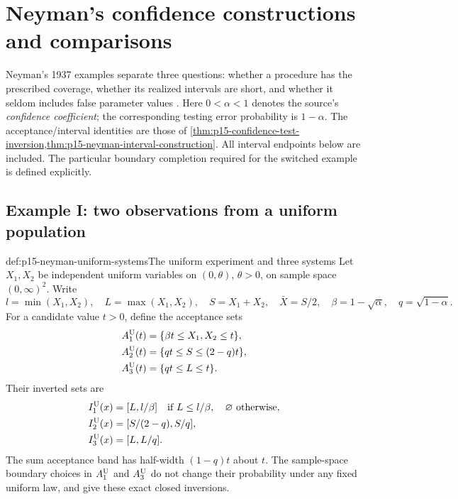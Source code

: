 \chapter{Neyman's confidence constructions and comparisons}
\label{sec:p15-neyman-confidence-constructions}

Neyman's 1937 examples separate three questions: whether a procedure
has the prescribed coverage, whether its realized intervals are short,
and whether it seldom includes false parameter values
\cite[pp.~356--378]{Neyman1937Confidence}. Here
\(0<\alpha<1\) denotes the source's \emph{confidence coefficient};
the corresponding testing error probability is \(1-\alpha\).
The acceptance/interval identities are those of
\cref{thm:p15-confidence-test-inversion,thm:p15-neyman-interval-construction}.
All interval endpoints below are included. The particular boundary
completion required for the switched example is defined explicitly.

\section{Example I: two observations from a uniform population}

\begin{hbdefinition}{def:p15-neyman-uniform-systems}{The uniform experiment and three systems}
Let \(X_1,X_2\) be independent uniform variables on \((0,\theta)\),
\(\theta>0\), on sample space \((0,\infty)^2\).
Write
\[
 l=\min(X_1,X_2),\quad L=\max(X_1,X_2),\quad
 S=X_1+X_2,\quad \bar X=S/2,\quad
 \beta=1-\sqrt\alpha,\quad q=\sqrt{1-\alpha}.
\]
For a candidate value \(t>0\), define the acceptance sets
\[
\begin{aligned}
 A_1^{\rm U}(t)&=\{\beta t\leq X_1,X_2\leq t\},\\
 A_2^{\rm U}(t)&=\{qt\leq S\leq(2-q)t\},\\
 A_3^{\rm U}(t)&=\{qt\leq L\leq t\}.
\end{aligned}
\]
Their inverted sets are
\[
\begin{aligned}
 I_1^{\rm U}(x)&=[L,l/\beta]\quad\hbox{if }L\leq l/\beta,
                    \quad\varnothing\hbox{ otherwise},\\
 I_2^{\rm U}(x)&=[S/(2-q),S/q],\\
 I_3^{\rm U}(x)&=[L,L/q].
\end{aligned}
\]
The sum acceptance band has half-width \((1-q)t\) about \(t\).
The sample-space boundary choices in \(A_1^{\rm U}\) and
\(A_3^{\rm U}\) do not change their probability under any
fixed uniform law, and give these exact closed inversions.
\end{hbdefinition}

